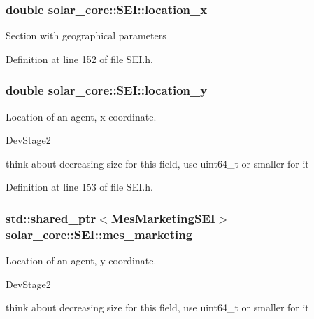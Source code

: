 \hypertarget{classsolar__core_1_1_s_e_i_a3de17f788667889770edaf7dc0fc054d}{}
\subsubsection[{location\+\_\+x}]{\setlength{\rightskip}{0pt plus 5cm}double solar\+\_\+core\+::\+S\+E\+I\+::location\+\_\+x}\label{classsolar__core_1_1_s_e_i_a3de17f788667889770edaf7dc0fc054d}
Section with geographical parameters 

Definition at line 152 of file S\+E\+I.\+h.

\hypertarget{classsolar__core_1_1_s_e_i_a5fc331197d08788392c3af1903f25763}{}
\subsubsection[{location\+\_\+y}]{\setlength{\rightskip}{0pt plus 5cm}double solar\+\_\+core\+::\+S\+E\+I\+::location\+\_\+y}\label{classsolar__core_1_1_s_e_i_a5fc331197d08788392c3af1903f25763}
Location of an agent, x coordinate.\begin{DoxyRefDesc}{Dev\+Stage2}
\item[\hyperlink{_dev_stage2__DevStage2000019}{Dev\+Stage2}]think about decreasing size for this field, use uint64\+\_\+t or smaller for it \end{DoxyRefDesc}


Definition at line 153 of file S\+E\+I.\+h.

\hypertarget{classsolar__core_1_1_s_e_i_ad5326c45ccd4a5512a6c0a296656264d}{}
\subsubsection[{mes\+\_\+marketing}]{\setlength{\rightskip}{0pt plus 5cm}std\+::shared\+\_\+ptr$<${\bf Mes\+Marketing\+S\+E\+I}$>$ solar\+\_\+core\+::\+S\+E\+I\+::mes\+\_\+marketing\hspace{0.3cm}{\ttfamily [protected]}}\label{classsolar__core_1_1_s_e_i_ad5326c45ccd4a5512a6c0a296656264d}
Location of an agent, y coordinate.\begin{DoxyRefDesc}{Dev\+Stage2}
\item[\hyperlink{_dev_stage2__DevStage2000020}{Dev\+Stage2}]think about decreasing size for this field, use uint64\+\_\+t or smaller for it \end{DoxyRefDesc}



